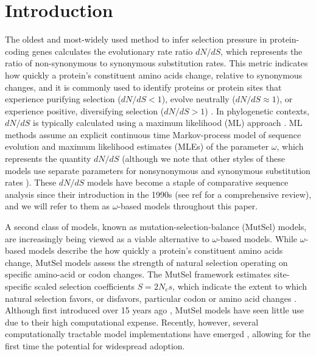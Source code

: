 \documentclass[11pt]{article}
\begin{document}
		
\section*{Introduction}
		
The oldest and most-widely used method to infer selection pressure in protein-coding genes calculates the evolutionary rate ratio $dN/dS$, which represents the ratio of non-synonymous to synonymous substitution rates. This metric indicates how quickly a protein's constituent amino acids change, relative to synonymous changes, and it is commonly used to identify proteins or protein sites that experience purifying selection ($dN/dS<1$), evolve neutrally ($dN/dS\approx1$), or experience positive, diversifying selection ($dN/dS>1$) \cite{NielsenYang1998, Yangetal2000, KosakovskyPondFrost2005b, Huelsenbecketal2006}. In phylogenetic contexts, $dN/dS$ is typically calculated using a maximum likelihood (ML) approach \cite{GoldmanYang1994,MuseGaut1994,NielsenYang1998,Yang2006}. ML methods assume an explicit continuous time Markov-process model of sequence evolution and maximum likelihood estimates (MLEs) of the parameter $\omega$, which represents the quantity $dN/dS$ (although we note that other styles of these models use separate parameters for nonsynonymous and synonymous substitution rates \cite{MuseGaut1994,KosakovskyPondMuse2005}). These $dN/dS$ models have become a staple of comparative sequence analysis since their introduction in the 1990s (see ref \cite{Anisimova2009} for a comprehensive review), and we will refer to them as $\omega$-based models throughout this paper.

A second class of models, known as mutation-selection-balance (MutSel) models, are increasingly being viewed as a viable alternative to $\omega$-based models. While $\omega$-based models describe the how quickly a protein's constituent amino acids change, MutSel models assess the strength of natural selection operating on specific amino-acid or codon changes. The MutSel framework estimates site-specific scaled selection coefficients $S=2N_es$, which indicate the extent to which natural selection favors, or disfavors, particular codon or amino acid changes \cite{HalpernBruno1998,YangNielsen2008,Rodrigueetal2010,Tamurietal2012}. Although first introduced over 15 years ago \cite{HalpernBruno1998}, MutSel models have seen little use due to their high computational expense. Recently, however, several computationally tractable model implementations have emerged \cite{RodrigueLartillot2014,Tamurietal2014}, allowing for the first time the potential for widespread adoption.		
		
\end{document}
